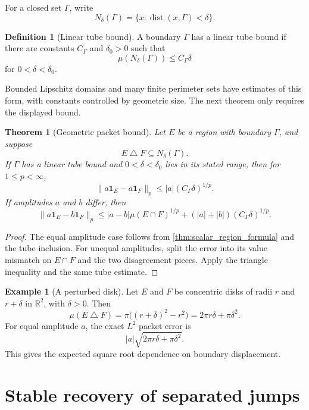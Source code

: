 \documentclass{aomart}
\newtheorem{theorem}{Theorem}[section]
\theoremstyle{definition}
\newtheorem{definition}[definition]{Definition}
\newtheorem{example}[example]{Example}
\theoremstyle{remark}
\newcommand{\RR}{\mathbb R}
\newcommand{\dist}{\operatorname{dist}}
\newcommand{\one}{\mathbf 1}
\begin{document}
For a closed set \(\Gamma\), write
\[
N_\delta(\Gamma)
=
\{x:\dist(x,\Gamma)<\delta\}.
\]

\begin{definition}[Linear tube bound]\label{def:linear_tube_bound}
A boundary \(\Gamma\) has a linear tube bound if there are constants \(C_\Gamma\) and \(\delta_0>0\) such that
\[
\mu(N_\delta(\Gamma))
\leq
C_\Gamma\delta
\]
for \(0<\delta<\delta_0\).
\end{definition}

Bounded Lipschitz domains and many finite perimeter sets have estimates of this form, with constants controlled by geometric size. The next theorem only requires the displayed bound.

\begin{theorem}[Geometric packet bound]\label{thm:geometric_packet_bound}
Let \(E\) be a region with boundary \(\Gamma\), and suppose
\[
E\mathbin\triangle F
\subseteq
N_\delta(\Gamma).
\]
If \(\Gamma\) has a linear tube bound and \(0<\delta<\delta_0\) lies in its stated range, then for \(1\leq p<\infty\),
\[
\|a\one_E-a\one_F\|_p
\leq
|a|(C_\Gamma\delta)^{1/p}.
\]
If amplitudes \(a\) and \(b\) differ, then
\[
\|a\one_E-b\one_F\|_p
\leq
|a-b|\mu(E\cap F)^{1/p}
+
(|a|+|b|)(C_\Gamma\delta)^{1/p}.
\]
\end{theorem}

\begin{proof}
The equal amplitude case follows from \cref{thm:scalar_region_formula} and the tube inclusion. For unequal amplitudes, split the error into its value mismatch on \(E\cap F\) and the two disagreement pieces. Apply the triangle inequality and the same tube estimate.
\end{proof}

\begin{example}[A perturbed disk]\label{ex:perturbed_disk}
Let \(E\) and \(F\) be concentric disks of radii \(r\) and \(r+\delta\) in \(\RR^2\), with \(\delta>0\). Then
\[
\mu(E\mathbin\triangle F)
=
\pi\bigl((r+\delta)^2-r^2\bigr)
=
2\pi r\delta+\pi\delta^2.
\]
For equal amplitude \(a\), the exact \(L^2\) packet error is
\[
|a|\sqrt{2\pi r\delta+\pi\delta^2}.
\]
This gives the expected square root dependence on boundary displacement.
\end{example}

\section{Stable recovery of separated jumps}\label{sec:jump_recovery}
\end{document}
